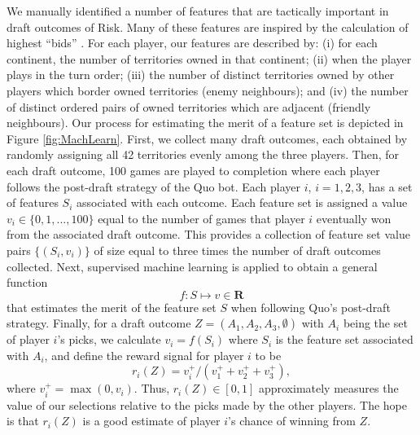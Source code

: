 \documentclass[letterpaper]{article}
\numberwithin{equation}{section}
\numberwithin{theorem}{section}
\numberwithin{lemma}{section}
\numberwithin{df}{section}
\begin{document}
We manually identified a number of features that are tactically important in draft outcomes of Risk.  Many of these features are inspired by the calculation of highest ``bids'' \cite{RiskBots}.  For each player, our features are described by: (i) for each continent, the number of territories owned in that continent; (ii) when the player plays in the turn order; (iii) the number of distinct territories owned by other players which border owned territories (enemy neighbours); and (iv) the number of distinct ordered pairs of owned territories which are adjacent (friendly neighbours).  Our process for estimating the merit of a feature set is depicted in Figure \ref{fig:MachLearn}.  First, we collect many draft outcomes, each obtained by randomly assigning all 42 territories evenly among the three players.  Then, for each draft outcome, 100 games are played to completion where each player follows the post-draft strategy of the Quo bot.  Each player $i$, $i=1,2,3$, has a set of features $S_i$ associated with each outcome.  Each feature set is assigned a value $v_i \in \{0,1,...,100\}$ equal to the number of games that player $i$ eventually won from the associated draft outcome.  This provides a collection of feature set value pairs $\{(S_i, v_i)\}$ of size equal to three times the number of draft outcomes collected.  Next, supervised machine learning is applied to obtain a general function
\[ f: S \mapsto v \in \textbf{R} \] 
that estimates the merit of the feature set $S$ when following Quo's post-draft strategy.  Finally, for a draft outcome $Z = (A_1,A_2,A_3,\emptyset)$ with $A_i$ being the set of player $i$'s picks, we calculate $v_i = f(S_i)$ where $S_i$ is the feature set associated with $A_i$, and define the reward signal for player $i$ to be
\[ r_i(Z) = v_i^+ / \left(v_1^+ + v_2^+ + v_3^+\right), \]
where $v_i^+ = \max(0, v_i)$.  %
Thus, $r_i(Z) \in [0, 1]$ approximately measures the value of our selections relative to the picks made by the other players.  The hope is that $r_i(Z)$ is a good estimate of player $i$'s chance of winning from $Z$.
\end{document}
